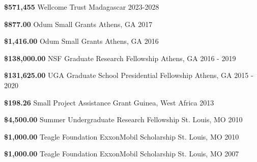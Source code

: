 \begin{cvhonors}


    \cvhonor
      {\textbf{\$571,455}} %
      {Wellcome Trust} %
      {Madagascar} %
      {2023-2028} %


    \cvhonor
      {\textbf{\$877.00}} %
      {Odum Small Grants } %
      {Athens, GA} %
      {2017} %

  \cvhonor
    {\textbf{\$1,416.00}} %
    {Odum Small Grants } %
    {Athens, GA} %
    {2016} %

  \cvhonor
    {\textbf{\$138,000.00}} %
    {NSF Graduate Research Fellowship} %
    {Athens, GA} %
    {2016 - 2019} %

  \cvhonor
    {\textbf{\$131,625.00}} %
    {UGA Graduate School Presidential Fellowship} %
    {Athens, GA} %
    {2015 - 2020} %

  \cvhonor
    {\textbf{\$198.26}} %
    {Small Project Assistance Grant} %
    {Guinea, West Africa} %
    {2013} %

  \cvhonor
    {\textbf{\$4,500.00}} %
    {Summer Undergraduate Research Fellowship} %
    {St. Louis, MO} %
    {2010} %

  \cvhonor
    {\textbf{\$1,000.00}} %
    {Teagle Foundation ExxonMobil Scholarship} %
    {St. Louis, MO} %
    {2010} %

  \cvhonor
    {\textbf{\$1,000.00}} %
    {Teagle Foundation ExxonMobil Scholarship} %
    {St. Louis, MO} %
    {2007} %

\end{cvhonors}

